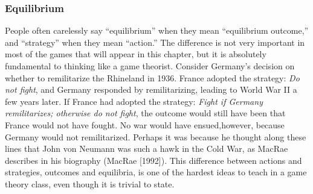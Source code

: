  \begin{frame}[fragile]\frametitle{Equilibrium}
People often carelessly say ``equilibrium'' when they mean ``equilibrium
outcome,''  and ``strategy'' when they   mean  ``action.'' The difference  is
not very important in  most of the games that will appear in  this chapter, but
it is absolutely fundamental to thinking like a game theorist. Consider
Germany's decision   on whether to remilitarize the Rhineland in 1936.    France
adopted the strategy: {\it Do not fight}, and Germany responded by
remilitarizing, leading to World War II a few years later.   If France  had
adopted the strategy: {\it Fight if  Germany remilitarizes; otherwise do not
fight},   the outcome would still have been that France would not have fought.
No war would  have ensued,however, because   Germany  would   not
remilitarized. Perhaps it was because he thought along these lines that John von
Neumann was such a hawk in the Cold War, as MacRae describes in his biography
(MacRae [1992]).  This difference between actions and strategies, outcomes and
equilibria, is one of the hardest ideas to teach  in a game theory class,  even
though it is trivial to state.
\end{frame}


